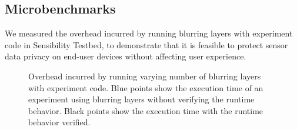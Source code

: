%
%

\subsection{Microbenchmarks}\label{sec-benchmark}

We measured the overhead incurred by running blurring layers with 
experiment code in Sensibility Testbed, to demonstrate that it is 
feasible to protect sensor data privacy on end-user devices without 
affecting user experience. 

\begin{figure}
\caption{\small Overhead incurred by running varying number of blurring 
layers with experiment code. Blue points show the execution time of 
an experiment using blurring layers without verifying the runtime behavior. 
Black points show the execution time with the runtime behavior verified. 
\label{fig-time}}
\end{figure}

